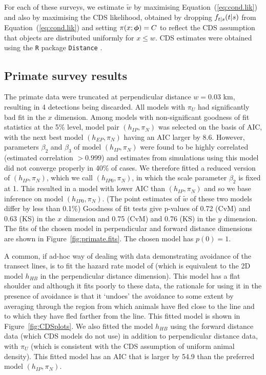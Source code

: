 \documentclass[useAMS,usenatbib,referee]{biom}
\begin{document}
For each of these surveys, we estimate $\tilde{w}$ by maximising Equation~(\ref{eq:cond.lik}) and also by maximising the CDS likelihood, obtained by dropping $f_{t|s}(\boldmath{t}|\boldmath{s})$ from Equation~(\ref{eq:cond.lik}) and setting $\pi(x;\mbox{\boldmath $\phi$})=C$ to reflect the CDS assumption that objects are distributed uniformly for $x\leq w$. CDS estimates were obtained using the \texttt{R} package  \texttt{Distance} \citep{Miller:15}.

\subsection{Primate survey results}

The primate data were truncated at perpendicular distance $w=0.03$ km, resulting in 4 detections being discarded. All models with $\pi_{U}$ had significantly bad fit in the $x$ dimension. Among models with non-significant goodness of fit statistics at the 5\% level, model pair $(h_{IP},\pi_{N})$ was selected on the basis of AIC, with the next best model $(h_{EP},\pi_{N})$ having an AIC larger by 8.6. However, parameters $\beta_2$ and $\beta_3$ of model $(h_{IP},\pi_{N})$ were found to be highly correlated (estimated correlation $>0.999$) and estimates from simulations using this model did not converge properly in 40\% of cases. We therefore fitted a reduced version of $(h_{IP},\pi_{N})$, which we call $(h_{IP0},\pi_{N})$, in which the scale parameter $\beta_2$ is fixed at 1. This resulted in a model with lower AIC than $(h_{IP},\pi_{N})$ and so we base inference on model $(h_{IP0},\pi_{N})$. (The point estimates of $\tilde{w}$ of these two models differ by less than 0.1\%) Goodness of fit tests give p-values of 0.72 (CvM)  and 0.63 (KS) in the $x$ dimension and 0.75 (CvM)  and 0.76 (KS) in the $y$ dimension. The fits of the chosen model in perpendicular and forward distance dimensions are shown in Figure~\ref{fig:primate.fits}. The chosen model has $p(0)=1$. 

A common, if ad-hoc way of dealing with data demonstrating avoidance of the transect lines, is to fit the hazard rate model of \cite{Hayes+Buckland:83} (which is equivalent to the 2D model $h_{HB}$ in the perpendicular distance dimension). This model has a flat shoulder and although it fits poorly to these data, the rationale for using it in the presence of avoidance is that it `undoes' the avoidance to some extent by averaging through the region from which animals have fled close to the line and to which they have fled farther from the line. This fitted model is shown in Figure~\ref{fig:CDSplots}. We also fitted the model $h_{HB}$ using the forward distance data (which CDS models do not use) in addition to perpendicular distance data, with $\pi_{U}$ (which is consistent with the CDS assumption of uniform animal density). This fitted model has an AIC that is larger by 54.9 than the preferred model $(h_{IP},\pi_{N})$. 
\end{document}
